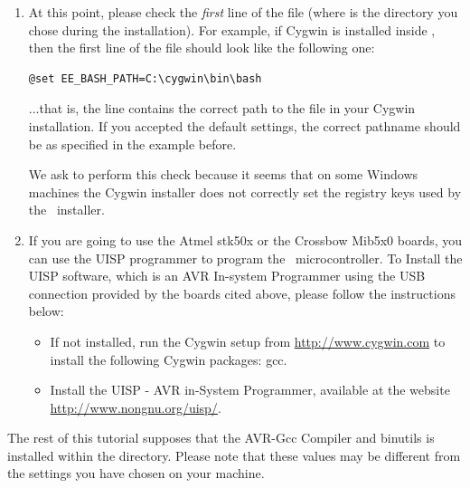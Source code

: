 \begin{enumerate}
\item At this point, please check the {\em first} line of the file
   (where 
  is the directory you chose during the installation). For example,
  if Cygwin is installed inside , then the first line
  of the file should look like the following one:
\begin{lstlisting}
@set EE_BASH_PATH=C:\cygwin\bin\bash
\end{lstlisting}
  ...that is, the line contains the correct path to the
   file in your Cygwin installation. If you accepted
  the default settings, the correct pathname should be
   as specified in the example before.
  \begin{note}
    We ask to perform this check because it seems that on some Windows
    machines the Cygwin installer does not correctly set the registry
    keys used by the \ee\ installer.
  \end{note}

\item If you are going to use the Atmel stk50x or the Crossbow Mib5x0
  boards, you can use the UISP programmer to program the \avr\
  microcontroller. To Install the UISP software, which is an AVR
  In-system Programmer using the USB connection provided by the boards
  cited above, please follow the instructions below:
  \begin{itemize}
  \item If not installed, run the Cygwin setup from
    \url{http://www.cygwin.com} to install the following Cygwin
    packages: gcc.
 
 \item Install the UISP - AVR in-System Programmer, available  at the 
    website \url{http://www.nongnu.org/uisp/}.  
\end{itemize}

\end{enumerate}

The rest of this tutorial supposes that the AVR-Gcc Compiler and binutils is
installed within the \file{C:\\WinAVR-20071221\\bin} directory.
Please note that these values may be different from the settings you have 
chosen on your machine.

